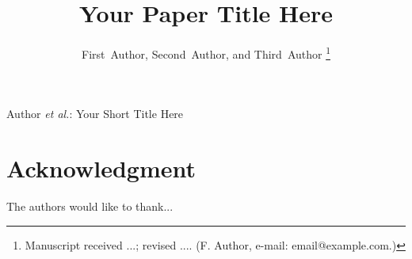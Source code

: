 \documentclass[journal]{IEEEtran}
\begin{document}
\title{Your Paper Title Here}

%
{Author \MakeLowercase{\textit{et al.}}: Your Short Title Here}

\author{First~Author, Second~Author, and Third~Author%
\thanks{Manuscript received ...; revised .... (F. Author, e-mail: email@example.com.)}}

\maketitle











\section*{Acknowledgment}
The authors would like to thank...



\end{document}
